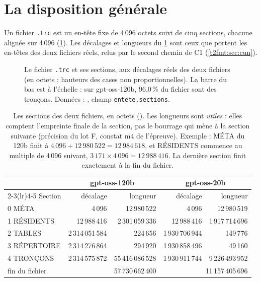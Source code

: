 \section{La disposition générale}\label{t2fmt:sec:disposition}

Un fichier \texttt{.trc} est un en-tête fixe de 4\,096 octets suivi de cinq sections, chacune alignée sur 4\,096 (\cref{t2fmt:fig:fichier}). Les décalages et longueurs du \cref{t2fmt:tab:sections} sont ceux que portent les en-têtes des deux fichiers réels, relus par le second chemin de C1 (\cref{t2fmt:sec:cun}).

\begin{figure}[ht]
\centering
\TdFmtFichier
\caption[Le fichier .trc, ses sections]{Le fichier \texttt{.trc} et ses sections, aux décalages réels des deux fichiers (en octets ; hauteurs des cases non proportionnelles). La barre du bas est à l'échelle : sur gpt-oss-120b, 96,0\,\% du fichier sont des tronçons. Données : , champ \texttt{entete.sections}.}
\label{t2fmt:fig:fichier}
\end{figure}

\begin{table}[ht]
\centering\small
\begin{tabular}{l r r r r}
\toprule
& \multicolumn{2}{c}{gpt-oss-120b} & \multicolumn{2}{c}{gpt-oss-20b} \\
\cmidrule(lr){2-3}\cmidrule(lr){4-5}
Section & décalage & longueur & décalage & longueur \\
\midrule
0 MÉTA & 4\,096 & 12\,980\,522 & 4\,096 & 12\,980\,519 \\
1 RÉSIDENTS & 12\,988\,416 & 2\,301\,059\,336 & 12\,988\,416 & 1\,917\,714\,696 \\
2 TABLES & 2\,314\,051\,584 & 224\,656 & 1\,930\,706\,944 & 149\,776 \\
3 RÉPERTOIRE & 2\,314\,276\,864 & 294\,920 & 1\,930\,858\,496 & 49\,160 \\
4 TRONÇONS & 2\,314\,575\,872 & 55\,416\,086\,528 & 1\,930\,911\,744 & 9\,226\,493\,952 \\
\midrule
fin du fichier & \multicolumn{2}{r}{57\,730\,662\,400} & \multicolumn{2}{r}{11\,157\,405\,696} \\
\bottomrule
\end{tabular}
\caption[Les sections des deux fichiers]{Les sections des deux fichiers, en octets (). Les longueurs sont \emph{utiles} : elles comptent l'empreinte finale de la section, pas le bourrage qui mène à la section suivante (précision du lot F, constat m4 de l'épreuve). Exemple : MÉTA du 120b finit à $4\,096 + 12\,980\,522 = 12\,984\,618$, et RÉSIDENTS commence au multiple de 4\,096 suivant, $3\,171 \times 4\,096 = 12\,988\,416$. La dernière section finit exactement à la fin du fichier.}
\label{t2fmt:tab:sections}
\end{table}

